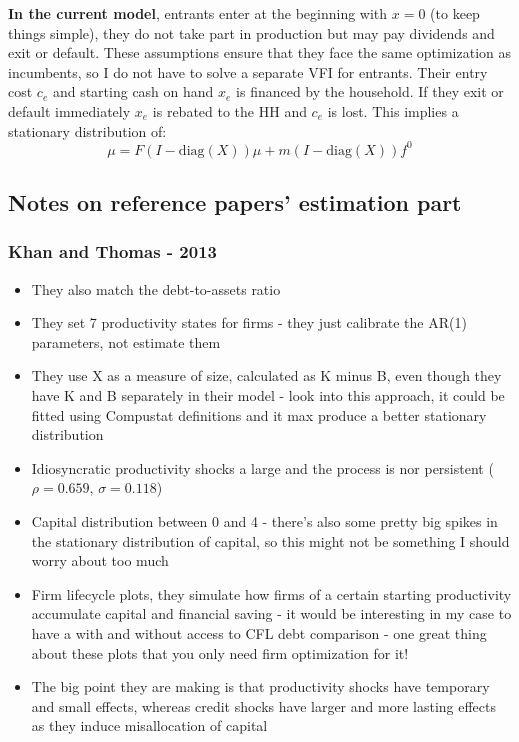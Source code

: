 \documentclass[12pt]{article}
\begin{document}
\textbf{In the current model}, entrants enter at the beginning with $x = 0$ (to keep things simple), they do not take part in production but may pay dividends and exit or default. These assumptions ensure that they face the same optimization as incumbents, so I do not have to solve a separate VFI for entrants. Their entry cost $c_e$ and starting cash on hand $x_e$ is financed by the household. If they exit or default immediately $x_e$ is rebated to the HH and $c_e$ is lost. This implies a stationary distribution of:
$$ \mu = F(I-\text{diag}(X)) \mu + m(I-\text{diag}(X))f^0 $$
\newpage
\subsection*{Notes on reference papers' estimation part}
\subsubsection*{Khan and Thomas - 2013}
\begin{itemize}\setlength\itemsep{0em} \small
    \item They also match the debt-to-assets ratio
    \item They set 7 productivity states for firms - they just calibrate the AR(1) parameters, not estimate them
    \item They use X as a measure of size, calculated as K minus B, even though they have K and B separately in their model - look into this approach, it could be fitted using Compustat definitions and it max produce a better stationary distribution
    \item Idiosyncratic productivity shocks a large and the process is nor persistent ($\rho = 0.659$, $\sigma = 0.118$)
    \item Capital distribution between 0 and 4 - there's also some pretty big spikes in the stationary distribution of capital, so this might not be something I should worry about too much
    \item Firm lifecycle plots, they simulate how firms of a certain starting productivity accumulate capital and financial saving - it would be interesting in my case to have a with and without access to CFL debt comparison - one great thing about these plots that you only need firm optimization for it!
    \item The big point they are making is that productivity shocks have temporary and small effects, whereas credit shocks have larger and more lasting effects as they induce misallocation of capital
\end{itemize} \normalsize
\end{document}
